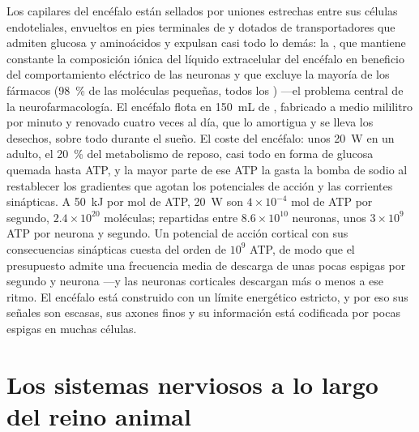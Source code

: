 \begin{proposition}\label{prop:b3:nervous-systems:barrier-budget}
Los capilares del encéfalo están sellados por uniones estrechas entre
sus células endoteliales, envueltos en pies terminales de  y
dotados de transportadores que admiten glucosa y aminoácidos y expulsan
casi todo lo demás: la \emph{}, que mantiene
constante la composición iónica del líquido extracelular del encéfalo
en beneficio del comportamiento eléctrico de las neuronas y que excluye
la mayoría de los fármacos (\qty{98}{\%} de las moléculas pequeñas,
todos los ) ---el problema central de la neurofarmacología.
El encéfalo flota en \qty{150}{mL} de \emph{},
fabricado a medio mililitro por minuto y renovado cuatro veces al día,
que lo amortigua y se lleva los desechos, sobre todo durante el sueño.
El coste del encéfalo: unos \qty{20}{W} en un adulto, el \qty{20}{\%}
del metabolismo de reposo, casi todo en forma de glucosa quemada hasta
ATP, y la mayor parte de ese ATP la gasta la bomba de sodio al
restablecer los gradientes que agotan los potenciales de acción y las
corrientes sinápticas. A \qty{50}{kJ} por mol de ATP, \qty{20}{W} son $4\times 10^{-4}$ mol
de ATP por segundo, $2.4\times 10^{20}$ moléculas; repartidas entre
$8.6\times 10^{10}$ neuronas, unos $3\times 10^{9}$ ATP por neurona y
segundo. Un potencial de acción cortical con sus consecuencias
sinápticas cuesta del orden de $10^{9}$ ATP, de modo que el presupuesto
admite una frecuencia media de descarga de unas pocas espigas por
segundo y neurona ---y las neuronas corticales descargan más o menos a
ese ritmo. El encéfalo está construido con un límite energético
estricto, y por eso sus señales son escasas, sus axones finos y su
información está codificada por pocas espigas en muchas células.
\end{proposition}
\admitted

\section{Los sistemas nerviosos a lo largo del reino animal}

